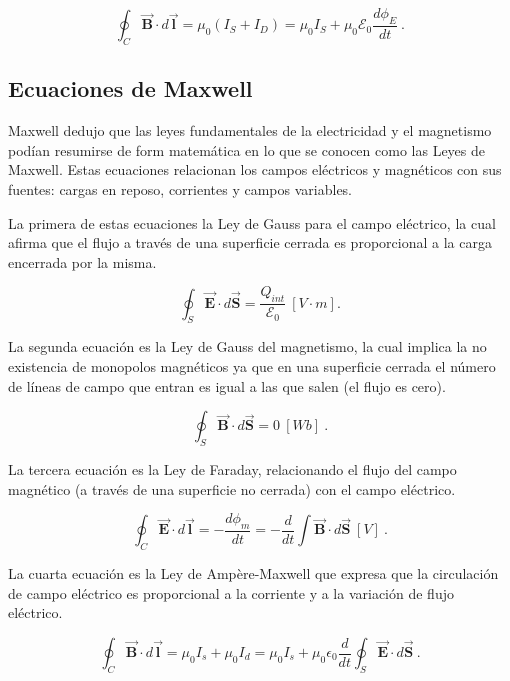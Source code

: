 \documentclass{tufte-handout}
\begin{document}
\begin{equation}
\oint_C \mathbf{\vec{B}}\cdot d\mathbf{\vec{l}} = \mu_0 (I_S + I_D) = \mu_0 I_S + \mu_0 \mathcal{E}_0\displaystyle\frac{d\phi_E}{dt}~.
\end{equation}

\subsection{Ecuaciones de Maxwell}

Maxwell dedujo que las leyes fundamentales de la electricidad y el magnetismo podían resumirse de form matemática en lo que se conocen como las Leyes de Maxwell. Estas ecuaciones relacionan los campos eléctricos y magnéticos con sus fuentes: cargas en reposo, corrientes y campos variables.

La primera de estas ecuaciones la Ley de Gauss para el campo eléctrico, la cual afirma que el flujo a través de una superficie cerrada es proporcional a la carga encerrada por la misma.

\begin{equation}
\oint_S \mathbf{\vec{E}}\cdot d\mathbf{\vec{S}} = \displaystyle\frac{Q_{int}}{\mathcal{E}_0}~[V\cdot m].
\end{equation}

La segunda ecuación es la Ley de Gauss del magnetismo, la cual implica la no existencia de monopolos magnéticos ya que en una superficie cerrada el número de líneas de campo que entran es igual a las que salen (el flujo es cero).

\begin{equation}
\oint_S \mathbf{\vec{B}}\cdot d\mathbf{\vec{S}} = 0~[Wb]~.
\end{equation}

La tercera ecuación es la Ley de Faraday, relacionando el flujo del campo magnético (a través de una superficie no cerrada) con el campo eléctrico.

\begin{equation}
\oint_C \mathbf{\vec{E}}\cdot d\mathbf{\vec{l}} = -\displaystyle\frac{d\phi_m}{dt} = -\displaystyle\frac{d}{dt}\int\mathbf{\vec{B}}\cdot d\mathbf{\vec{S}}~[V]~.
\end{equation}

La cuarta ecuación es la Ley de Ampère-Maxwell que expresa que la circulación de campo eléctrico es proporcional a la corriente y a la variación de flujo eléctrico.

\begin{equation}
\oint_C \mathbf{\vec{B}}\cdot d\mathbf{\vec{l}} = \mu_0 I_s + \mu_0 I_d = \mu_0 I_s + \mu_0 \epsilon_0 \displaystyle\frac{d}{dt}\oint_S \mathbf{\vec{E}}\cdot d\mathbf{\vec{S}}~.
\end{equation}
\end{document}
